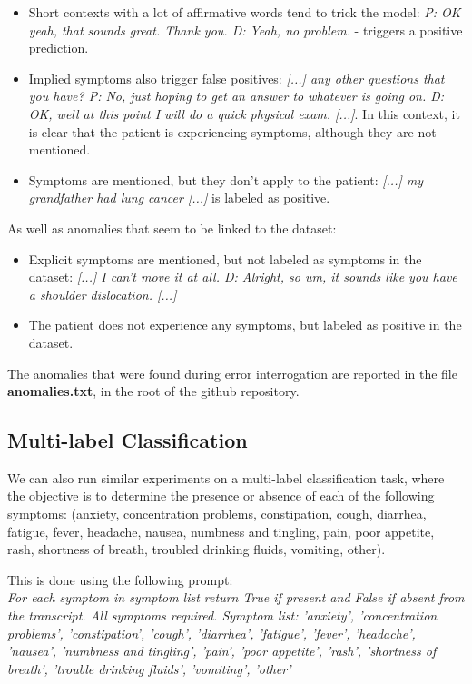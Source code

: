 \documentclass[11pt]{article}
\begin{document}
\begin{itemize}
    \item Short contexts with a lot of affirmative words tend to trick the model: \textit{P: OK yeah, that sounds great. Thank you. D: Yeah, no problem.} - triggers a positive prediction.
    \item Implied symptoms also trigger false positives: \textit{[...] any other questions that you have? P: No, just hoping to get an answer to whatever is going on. D: OK, well at this point I will do a quick physical exam. [...]}. In this context, it is clear that the patient is experiencing symptoms, although they are not mentioned.
    \item Symptoms are mentioned, but they don't apply to the patient: \textit{[...] my grandfather had lung cancer [...]} is labeled as positive.
\end{itemize}

As well as anomalies that seem to be linked to the dataset:

\begin{itemize}
    \item Explicit symptoms are mentioned, but not labeled as symptoms in the dataset: \textit{[...] I can't move it at all. D: Alright, so um, it sounds like you have a shoulder dislocation. [...]}
    \item The patient does not experience any symptoms, but labeled as positive in the dataset.
\end{itemize}

The anomalies that were found during error interrogation are reported in the file \textbf{anomalies.txt}, in the root of the github repository.

\subsection{Multi-label Classification}

We can also run similar experiments on a multi-label classification task, where the objective is to determine the presence or absence of each of the following symptoms: (anxiety, concentration problems, constipation, cough, diarrhea, fatigue, fever, headache, nausea, numbness and tingling, pain, poor appetite, rash, shortness of breath, troubled drinking fluids, vomiting, other).

This is done using the following prompt:\\

\textit{For each symptom in symptom list return True if present and False if absent from the transcript. All symptoms required. Symptom list: 'anxiety', 'concentration problems', 'constipation', 'cough', 'diarrhea', 'fatigue', 'fever', 'headache', 'nausea', 'numbness and tingling', 'pain', 'poor appetite', 'rash', 'shortness of breath', 'trouble drinking fluids', 'vomiting', 'other'}\\
\end{document}
